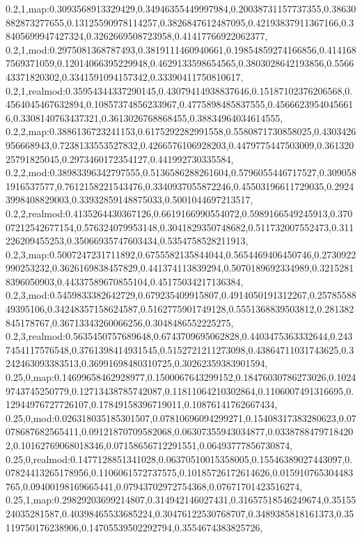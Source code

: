 0.2,1,map:0.3093568913329429,0.34946355449997984,0.20038731157737355,0.38630882873277655,0.13125590978114257,0.3826847612487095,0.42193837911367166,0.38405699947427324,0.3262669508723958,0.41417766922062377,
0.2,1,mod:0.2975081368787493,0.3819111460940661,0.19854859274166856,0.4141687569371059,0.12014066395229948,0.4629133598654565,0.3803028642193856,0.556643371820302,0.3341591094157342,0.33390411750810617,
0.2,1,realmod:0.35954344337290145,0.43079414938837646,0.15187102376206568,0.4564045467632894,0.10857374856233967,0.4775898485837555,0.45666239540456616,0.3308140763437321,0.3613026768868455,0.38834964034614555,
0.2,2,map:0.3886136723241153,0.6175292282991558,0.5580871730858025,0.4303426956668943,0.7238133553527832,0.4266576106928203,0.4479775447503009,0.36132025791825045,0.2973460172354127,0.441992730335584,
0.2,2,mod:0.38983396342797555,0.5136586288261604,0.5796055446717527,0.3090581916537577,0.7612158221543476,0.3340937055872246,0.45503196611729035,0.29243998408829003,0.33932859148875033,0.5001044697213517,
0.2,2,realmod:0.4135264430367126,0.6619166990554072,0.5989166549245913,0.37007212542677154,0.576324079953148,0.3041829350748682,0.511732007552473,0.311226209455253,0.35066935747603434,0.5354758528211913,
0.2,3,map:0.5007247231711892,0.6755582135844044,0.5654469406450746,0.2730922990253232,0.3626169838457829,0.441374113839294,0.5070189692334989,0.32152818396050903,0.44337589670855104,0.45175034217136384,
0.2,3,mod:0.5459833382642729,0.679235409915807,0.4914050191312267,0.2578558849395106,0.34248357158624587,0.5162775901749128,0.5551368839503812,0.281382845178767,0.36713343260066256,0.3048486552225275,
0.2,3,realmod:0.5635450757689648,0.6743709695062828,0.4403475363332644,0.2437454117576548,0.3761398414931545,0.5152721211273098,0.43864711031743625,0.3242463093383513,0.36991698480310725,0.30262359383901594,
0.25,0,map:0.14699658462928977,0.1500067643299152,0.18476030786273026,0.10249743745250779,0.12713438785742087,0.11811064210302864,0.1106007491316695,0.12944976727726107,0.17849158396719011,0.10876141762667434,
0.25,0,mod:0.026318035185301507,0.07810696094299271,0.15408317383280623,0.07078687682565411,0.09121870709582068,0.06307355943034877,0.03387884797184202,0.10162769068018346,0.07158656712291551,0.06493777856730874,
0.25,0,realmod:0.1477128851341028,0.06370510015358005,0.15546389027443097,0.07824413265178956,0.1106061572737575,0.10185726172614626,0.015910765304483765,0.09400198169665441,0.07943702972754368,0.07671701423516274,
0.25,1,map:0.29829203699214807,0.314942146027431,0.31657518546249674,0.3515524035281587,0.40398465533685224,0.30476122530768707,0.3489385818161373,0.35119750176238906,0.14705539502292794,0.3554674383825726,
